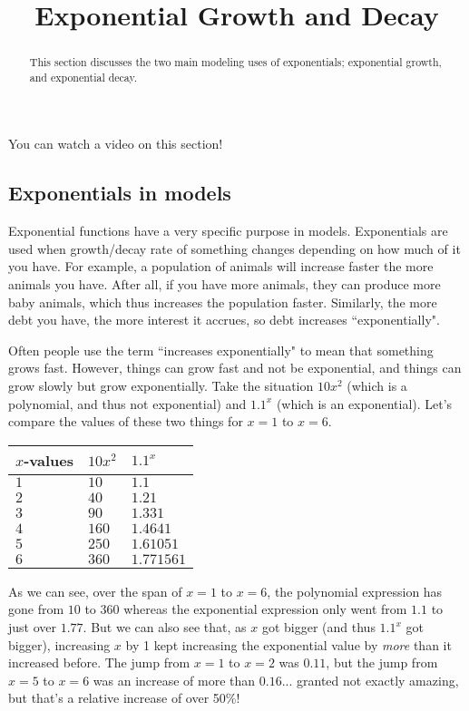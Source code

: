 \documentclass{ximera}
\title{Exponential Growth and Decay}
\begin{document}
\begin{abstract}
    This section discusses the two main modeling uses of exponentials; exponential growth, and exponential decay.
\end{abstract}
\maketitle
    

You can watch a video on this section!

    
\subsection*{Exponentials in models}
    
    Exponential functions have a very specific purpose in models. Exponentials are used when growth/decay rate of something changes depending on how much of it you have. For example, a population of animals will increase faster the more animals you have. After all, if you have more animals, they can produce more baby animals, which thus increases the population faster. Similarly, the more debt you have, the more interest it accrues, so debt increases ``exponentially".
    
    Often people use the term ``increases exponentially" to mean that something grows fast. However, things can grow fast and not be exponential, and things can grow slowly but grow exponentially. Take the situation $10x^2$ (which is a polynomial, and thus not exponential) and $1.1^x$ (which is an exponential). Let's compare the values of these two things for $x=1$ to $x=6$.
    
    \begin{center}
        \begin{tabular}{l|l|l}
            $x$-values & $10x^2$ & $1.1^x$ \\\hline
            $1$ & $10$ & $1.1$\\
            $2$ & $40$ & $1.21$\\
            $3$ & $90$ & $1.331$\\
            $4$ & $160$ & $1.4641$\\
            $5$ & $250$ & $1.61051$\\
            $6$ & $360$ & $1.771561$
        \end{tabular}
    \end{center}
    
    As we can see, over the span of $x=1$ to $x=6$, the polynomial expression has gone from $10$ to $360$ whereas the exponential expression only went from $1.1$ to just over $1.77$. But we can also see that, as $x$ got bigger (and thus $1.1^x$ got bigger), increasing $x$ by 1 kept increasing the exponential value by \textit{more} than it increased before. The jump from $x=1$ to $x=2$ was $0.11$, but the jump from $x=5$ to $x=6$ was an increase of more than $0.16$... granted not exactly amazing, but that's a relative increase of over 50\%!
    
\end{document}
